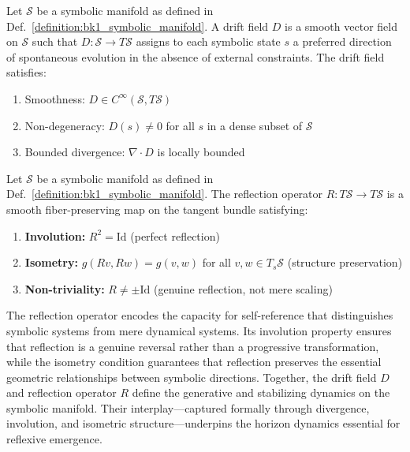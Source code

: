 \begin{definition}
\label{definition:bk1_drift_field}
Let $\mathcal{S}$ be a symbolic manifold as defined in Def.~\ref{definition:bk1_symbolic_manifold}.  
A drift field $D$ is a smooth vector field on $\mathcal{S}$ such that \( D: \mathcal{S} \rightarrow T\mathcal{S} \) assigns to each symbolic state \( s \) a preferred direction of spontaneous evolution in the absence of external constraints. The drift field satisfies:
\begin{enumerate}
    \item Smoothness: \( D \in C^\infty(\mathcal{S}, T\mathcal{S}) \)
    \item Non-degeneracy: \( D(s) \neq 0 \) for all \( s \) in a dense subset of \( \mathcal{S} \)
    \item Bounded divergence: \( \nabla \cdot D \) is locally bounded
\end{enumerate}
\end{definition}

\begin{definition}
\label{definition:bk1_reflection_operator}
Let $\mathcal{S}$ be a symbolic manifold as defined in Def.~\ref{definition:bk1_symbolic_manifold}.  
The reflection operator \( R: T\mathcal{S} \rightarrow T\mathcal{S} \) is a smooth fiber-preserving map on the tangent bundle satisfying:
\begin{enumerate}
    \item \textbf{Involution:} \( R^2 = \text{Id} \) (perfect reflection)
    \item \textbf{Isometry:} \( g(Rv, Rw) = g(v, w) \) for all \( v, w \in T_s\mathcal{S} \) (structure preservation)
    \item \textbf{Non-triviality:} \( R \neq \pm\text{Id} \) (genuine reflection, not mere scaling)
\end{enumerate}
\end{definition}

The reflection operator encodes the capacity for self-reference that distinguishes symbolic systems from mere dynamical systems. Its involution property ensures that reflection is a genuine reversal rather than a progressive transformation, while the isometry condition guarantees that reflection preserves the essential geometric relationships between symbolic directions. Together, the drift field \( D \) and reflection operator \( R \) define the generative and stabilizing dynamics on the symbolic manifold. Their interplay—captured formally through divergence, involution, and isometric structure—underpins the horizon dynamics essential for reflexive emergence.


